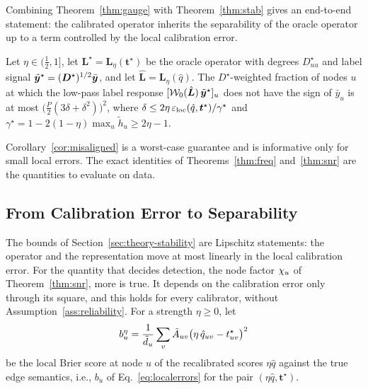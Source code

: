 Combining Theorem~\ref{thm:gauge} with Theorem~\ref{thm:stab} gives an end-to-end statement: the calibrated operator inherits the separability of the oracle operator up to a term controlled by the local calibration error.

\begin{corollary}\label{cor:misaligned}
Let $\eta\in(\tfrac12,1]$, let $\bm L^\star=\bm L_\eta(\bm t^\star)$ be the oracle operator with degrees $D^\star_{uu}$ and label signal $\tilde{\bm{y}}^\star=(\bm D^\star)^{1/2}\bar{\bm{y}}$, and let $\hat{\bm L}=\bm L_\eta(\hat q)$.
The $D^\star$-weighted fraction of nodes $u$ at which the low-pass label response $[\mathcal W_0(\hat{\bm L})\,\tilde{\bm{y}}^\star]_u$ does not have the sign of $\bar y_u$ is at most $\bigl(\tfrac P2(3\delta+\delta^2)\bigr)^2$, where $\delta\le2\eta\,\varepsilon_{\mathrm{loc}}(\hat q,\bm t^\star)/\gamma^\star$ and $\gamma^\star=1-2(1-\eta)\max_u\tilde h_u\ge2\eta-1$.
\end{corollary}

Corollary~\ref{cor:misaligned} is a worst-case guarantee and is informative only for small local errors.
The exact identities of Theorems~\ref{thm:freq} and~\ref{thm:snr} are the quantities to evaluate on data.

\subsection{From Calibration Error to Separability}\label{sec:theory-brier}

The bounds of Section~\ref{sec:theory-stability} are Lipschitz statements: the operator and the representation move at most linearly in the local calibration error.
For the quantity that decides detection, the node factor $\chi_u$ of Theorem~\ref{thm:snr}, more is true.
It depends on the calibration error only through its square, and this holds for every calibrator, without Assumption~\ref{ass:reliability}.
For a strength $\eta\ge0$, let
\begin{equation}
b^{\eta}_u=\frac{1}{\tilde d_u}\sum_v\tilde A_{uv}\bigl(\eta\,\hat q_{uv}-t^{\star}_{uv}\bigr)^2
\label{eq:localbrier}
\end{equation}
be the local Brier score at node $u$ of the recalibrated scores $\eta\hat q$ against the true edge semantics, i.e., $b_u$ of Eq.~\eqref{eq:localerrors} for the pair $(\eta\hat q,\bm t^\star)$.

